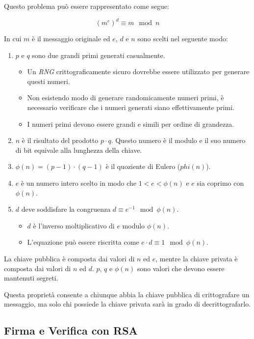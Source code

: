 \noindent Questo problema può essere rappresentato come segue:

$$(m^e)^d \equiv m \mod n$$

\noindent In cui $m$ è il messaggio originale ed $e$, $d$ e $n$ sono scelti nel seguente modo:
\begin{enumerate}
	\item $p$ e $q$ sono due grandi primi generati casualmente.
	      \begin{itemize}
		      \item Un \emph{\gls{RNG}} crittograficamente sicuro dovrebbe essere utilizzato per generare questi numeri.
		      \item Non esistendo modo di generare randomicamente numeri primi, è necessario verificare che i numeri generati siano effettivamente primi.
		      \item I numeri primi devono essere grandi e simili per ordine di grandezza.
	      \end{itemize}
	\item $n$ è il risultato del prodotto $p \cdot q$. Questo numero è il modulo e il suo numero di bit equivale alla lunghezza della chiave.
	\item $\phi(n) = (p - 1) \cdot (q - 1)$ è il quoziente di Eulero ($phi(n)$).
	\item $e$ è un numero intero scelto in modo che $1 < e < \phi(n)$ e $e$ sia coprimo con $\phi(n)$.
	\item $d$ deve soddisfare la congruenza $d \equiv e^{-1} \mod \phi(n)$.
	      \begin{itemize}
		      \item $d$ è l'inverso moltiplicativo di $e$ modulo $\phi(n)$.
		      \item L'equazione può essere riscritta come $e \cdot d \equiv 1 \mod \phi(n)$.
	      \end{itemize}
\end{enumerate}

La chiave pubblica è composta dai valori di $n$ ed $e$, mentre la chiave privata è composta dai valori di $n$ ed $d$.
$p$, $q$ e $\phi(n)$ sono valori che devono essere mantenuti segreti.

Questa proprietà consente a chiunque abbia la chiave pubblica di crittografare un messaggio, ma solo chi possiede la chiave privata sarà in grado di decrittografarlo.

\subsection{Firma e Verifica con RSA}
\label{cap:rsassa}

